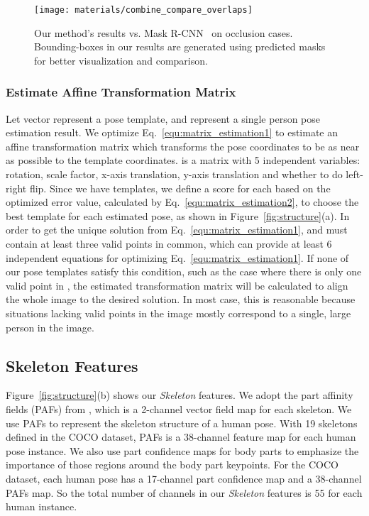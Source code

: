 \documentclass[10pt,twocolumn,letterpaper]{article}
\begin{document}
\begin{figure*}[t]
\setlength{\abovecaptionskip}{0.1cm}
\setlength{\belowcaptionskip}{-0.4cm}
\centering
\texttt{[image: materials/combine\_compare\_overlaps]}
\caption{Our method's results vs. Mask R-CNN~\cite{He2017Mask} on occlusion cases. Bounding-boxes in our results are generated using predicted masks for better visualization and comparison.}
\label{fig:combine_compare_overlaps}
\end{figure*}
 

\subsubsection{Estimate Affine Transformation Matrix}
Let vector  represent a pose template, and  represent a single person pose estimation result. We optimize
Eq.~\ref{equ:matrix_estimation1} to estimate an affine transformation matrix  which transforms the pose coordinates to be as near as possible to the template coordinates.  is a  matrix with 5 independent variables: rotation, scale factor, x-axis translation, y-axis translation and whether to do left-right flip. Since we have  templates, we define a score for each  based on the optimized error value, calculated by Eq.~\ref{equ:matrix_estimation2}, to choose the best template for each estimated pose, as shown in Figure~\ref{fig:structure}(a). In order to get the unique solution from Eq.~\ref{equ:matrix_estimation1},  and  must contain at least three valid points in common, which can provide at least 6 independent equations for optimizing Eq.~\ref{equ:matrix_estimation1}. If none of our pose templates satisfy this condition, such as the case where there is only one valid point in , the estimated transformation matrix  will be calculated to align the whole image to the desired solution. In most case, this is reasonable because situations lacking valid points in the image mostly correspond to a single, large person in the image. 

\vspace{-0.4cm}



\subsection{Skeleton Features}
\label{sec:Skel}
Figure~\ref{fig:structure}(b) shows our \emph{Skeleton} features. We adopt the part affinity fields (PAFs) from \cite{cao2017realtime}, which is a 2-channel vector field map for each skeleton. We use PAFs to represent the skeleton structure of a human pose. With 19 skeletons defined in the COCO dataset, PAFs is a 38-channel feature map for each human pose instance. We also use part confidence maps for body parts to emphasize the importance of those regions around the body part keypoints. For the COCO dataset, each human pose has a 17-channel part confidence map and a 38-channel PAFs map. So the total number of channels in our \emph{Skeleton} features is 55 for each human instance.
\end{document}
